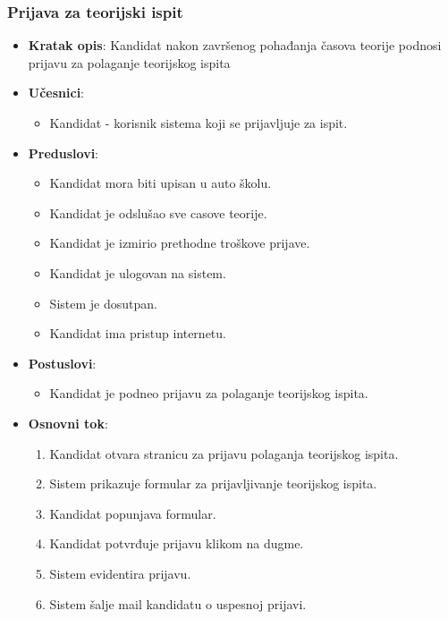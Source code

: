 \subsubsection{Prijava za teorijski ispit}
\label{subsubsec:prijava za ispit}
\begin{itemize}
  \item \textbf{Kratak opis}: Kandidat nakon završenog pohađanja časova teorije podnosi prijavu za polaganje teorijskog ispita
  \item \textbf{Učesnici}:
    \begin{itemize}
    \item Kandidat - korisnik sistema koji se prijavljuje za ispit.
    \end{itemize}
  \item \textbf{Preduslovi}:
    \begin{itemize}
    \item  Kandidat mora biti upisan u auto školu.
    \item  Kandidat je odslušao sve casove teorije.
    \item  Kandidat je izmirio prethodne troškove prijave.
    \item  Kandidat je ulogovan na sistem.
    \item  Sistem je dosutpan.
    \item  Kandidat ima pristup internetu.
    \end{itemize}
  \item \textbf{Postuslovi}:
      \begin{itemize}
      \item Kandidat je podneo prijavu za polaganje teorijskog ispita.
      \end{itemize}
  \item \textbf{Osnovni tok}:
      \begin{enumerate}
        \item Kandidat otvara stranicu za prijavu polaganja teorijskog ispita.
        \item Sistem prikazuje formular za prijavljivanje teorijskog ispita.
        \item Kandidat popunjava formular.
        \item Kandidat potvrđuje prijavu klikom na dugme.
        \item Sistem evidentira prijavu.
        \item Sistem šalje mail kandidatu o uspesnoj prijavi.  
      \end{enumerate}


\end{itemize}
